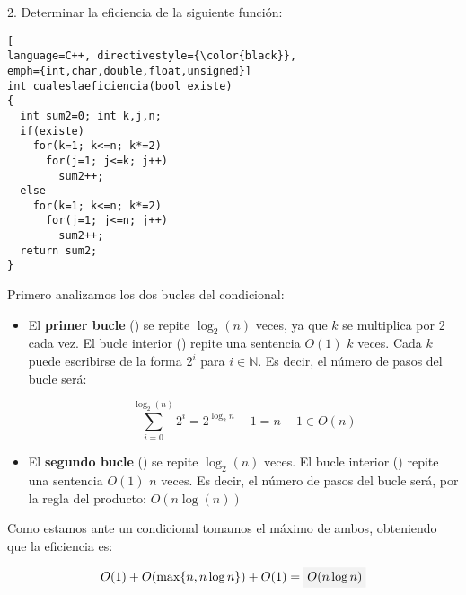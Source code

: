 \begin{ejercicio}
{2. Determinar la eficiencia de la siguiente función:}
\begin{lstlisting}[
language=C++, directivestyle={\color{black}},
emph={int,char,double,float,unsigned}]
int cualeslaeficiencia(bool existe)
{
  int sum2=0; int k,j,n;
  if(existe)
    for(k=1; k<=n; k*=2)
      for(j=1; j<=k; j++)
        sum2++;
  else
    for(k=1; k<=n; k*=2)
      for(j=1; j<=n; j++)
        sum2++;
  return sum2;
}
\end{lstlisting}
\vspace*{5mm}

Primero analizamos los dos bucles del condicional:

\begin{itemize}

\item El \textbf{primer bucle} () se repite $\log_2(n)$ veces,
ya que $k$ se  multiplica por 2 cada vez.
El bucle interior () repite una sentencia $O(1)$ $k$ veces.
Cada $k$ puede escribirse de la forma $2^i$ para $i \in \mathbb{N}$.
Es decir, el número de pasos del bucle será:

\[\sum_{i=0}^{\log_2(n)} 2^i = 2^{\log_2{n}} -1 = n -1 \in O(n)\]

\item El \textbf{segundo bucle} () se repite $\log_2(n)$ veces.
El bucle interior () repite una sentencia $O(1)$ $n$ veces.
Es decir, el número de pasos del bucle será, por la regla del producto:
$O(n\log(n))$
\end{itemize}

Como estamos ante un condicional tomamos el máximo de ambos,
obteniendo que la eficiencia es:

\[O(1) + O(\max\{n,n\log n\}) + O(1)  = \resultado{O(n\log n)}\]

\end{ejercicio}
